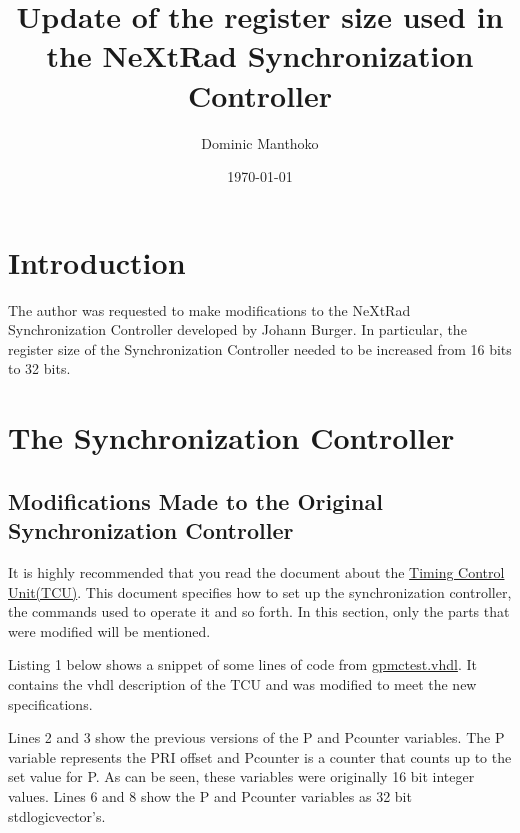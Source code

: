 \documentclass[12pt, a4paper]{article}
\title{Update of the register size used in the NeXtRad Synchronization Controller}
\author{Dominic Manthoko}
\date{\today}
\begin{document}
\maketitle

\sloppy


\section{Introduction}

The author was requested to make modifications to the NeXtRad Synchronization Controller developed by Johann Burger. In particular, the register size of the Synchronization Controller needed to be increased from 16 bits to 32 bits. 


\section{The Synchronization Controller}
\subsection{Modifications Made to the Original Synchronization Controller}
It is highly recommended that you read the document about the \href{https://docs.google.com/document/d/1E-mxDRlNcjSsjckUj8SuQOPBRs8Zv4AUUxXzLDHU3zc/edit?usp=sharing}{Timing Control Unit(TCU)}. This document specifies how to set up the synchronization controller, the commands used to operate it and so forth. In this section, only the parts that were modified will be mentioned.

Listing 1 below shows a snippet of some lines of code from \href{https://github.com/DManthoko86/NeXtRAD-TCU/blob/master/NeXtRAD-TCU-Controller/gpmc_test.vhd}{gpmc\textunderscore test.vhdl}. 
It contains the vhdl description of the TCU and was modified to meet the new specifications.



Lines 2 and 3 show the previous versions of the P and Pcounter variables. The P variable represents the PRI offset and Pcounter is a counter that counts up to the set value for P. 
As can be seen, these variables were originally 16 bit integer values. Lines 6 and 8 show the P and Pcounter variables as 32 bit std\textunderscore logic\textunderscore vector's.
\end{document}

